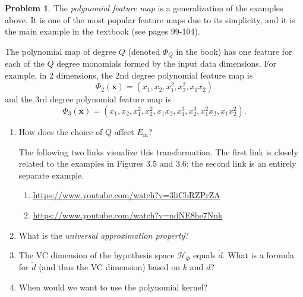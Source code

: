 \documentclass[10pt]{exam}
\theoremstyle{definition}
\newtheorem{problem}{Problem}
\newcommand{\Ein}{E_{\text{in}}}
\newcommand{\x}{\mathbf x}
\newcommand{\HH}[1]{\mathcal H_{\text{#1}}}
\begin{document}
\begin{problem}
    The \emph{polynomial feature map} is a generalization of the examples above.
    It is one of the most popular feature maps due to its simplicity,
    and it is the main example in the textbook (see pages 99-104).

    The polynomial map of degree $Q$ (denoted $\Phi_Q$ in the book) has one feature for each of the $Q$ degree monomials formed by the input data dimensions.
    For example, in 2 dimensions, the 2nd degree polynomial feature map is
    \begin{equation}
        \Phi_2(\x) = (x_1, x_2, x_1^2, x_2^2, x_1x_2)
    \end{equation}
    and the 3rd degree polynomial feature map is
    \begin{equation}
        \Phi_3(\x) = (x_1, x_2, x_1^2, x_2^2, x_1x_2, x_1^3, x_2^3, x_1^2x_2, x_1x_2^2)
        .
    \end{equation}

    \begin{enumerate}
        \item
            How does the choice of $Q$ affect $\Ein$?
            \vspace{6in}

        The following two links visualize this transformation.
        The first link is closely related to the examples in Figures 3.5 and 3.6;
            the second link is an entirely separate example.
        \begin{enumerate}
            \item \url{https://www.youtube.com/watch?v=3liCbRZPrZA}
            \item \url{https://www.youtube.com/watch?v=ndNE8he7Nnk}
        \end{enumerate}

        \item
            What is the \emph{universal approximation property}?
            \vspace{3in}

            \newpage
        \item
        The VC dimension of the hypothesis space $\HH{$\Phi$}$ equals $	\tilde d$.
        What is a formula for $	\tilde d$ (and thus the VC dimension) based on $k$ and $d$?
            \vspace{4in}


        \item
        When would we want to use the polynomial kernel?
    \end{enumerate}
\end{problem}
\end{document}
